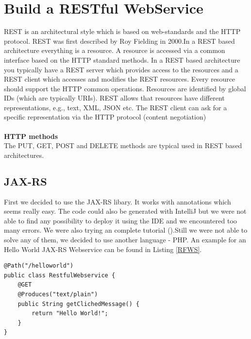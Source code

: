 \documentclass[12pt]{article}
\begin{document}
\section{Build a RESTful WebService}
REST is an architectural style which is based on web-standards and the HTTP protocol. REST was first described by Roy Fielding in 2000.In a REST based architecture everything is a resource. A resource is accessed via a common interface based on the HTTP standard methods. In a REST based architecture you typically have a REST server which provides access to the resources and a REST client which accesses and modifies the REST resources. Every resource should support the HTTP common operations. Resources are identified by global IDs (which are typically URIs). REST allows that resources have different representations, e.g., text, XML, JSON etc. The REST client can ask for a specific representation via the HTTP protocol (content negotiation)  \cite{vogella}
\\\\
\textbf{HTTP methods} \\
The PUT, GET, POST and DELETE methods are typical used in REST based architectures.
 \cite{vogella}
\subsection{JAX-RS}
First we decided to use the JAX-RS libary. It works with annotations which seems really easy.
The code could also be generated with IntelliJ but we were not able to find any possibility to deploy it using the IDE and we encountered too many errors. We were also trying an complete tutorial (\cite{vogella}).Still we were not able to solve any of them, we decided to use another language - PHP. An example for an Hello World JAX-RS Webservice can be found in Listing \ref{RFWS}.
\begin{lstlisting}[caption=Restful Webservice, label=RFWS]
@Path("/helloworld")
public class RestfulWebservice {
    @GET
    @Produces("text/plain")
    public String getClichedMessage() {
        return "Hello World!";
    }
}
\end{lstlisting}
\end{document}

